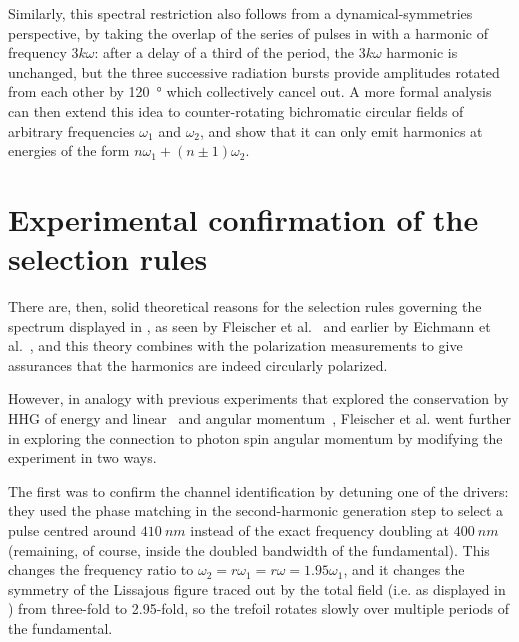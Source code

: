 Similarly, this spectral restriction also follows from a dynamical-symmetries perspective, by taking the overlap of the series of pulses in  with a harmonic of frequency $3k\omega$: after a delay of a third of the period, the $3k\omega$ harmonic is unchanged, but the three successive radiation bursts provide amplitudes rotated from each other by \SI{120}{\degree} which collectively cancel out. A more formal analysis~\cite{SelectionRulesInHHG, averbukh_stability_2002} can then extend this idea to counter-rotating bichromatic circular fields of arbitrary frequencies $\omega_1$ and $\omega_2$, and show that it can only emit harmonics at energies of the form $n\omega_1+(n\pm 1)\omega_2$.





\section{Experimental confirmation of the selection rules}
There are, then, solid theoretical reasons for the selection rules governing the spectrum displayed in , as seen by Fleischer et al.~\cite{fleischer_spin_2014} and earlier by Eichmann et al.~\cite{EichmannExperiment}, and this theory combines with the polarization measurements to give assurances that the harmonics are indeed circularly polarized.

However, in analogy with previous experiments that explored the conservation by HHG of energy \cite{EnergyConservationExperiment} and linear~\cite{ MomentumConservationExperiment} and angular momentum~\cite{ OAMConservationExperiment}, Fleischer et al. went further in exploring the connection to photon spin angular momentum by modifying the experiment in two ways.

The first was to confirm the channel identification by detuning one of the drivers: they used the phase matching in the second-harmonic generation step to select a pulse centred around $\SI{410}{nm}$ instead of the exact frequency doubling at $\SI{400}{nm}$ (remaining, of course, inside the doubled bandwidth of the fundamental). This changes the frequency ratio to $\omega_2=r\omega_1=r\omega=1.95\omega_1$, and it changes the symmetry of the Lissajous figure traced out by the total field (i.e. as displayed in ) from three-fold to 2.95-fold, so the trefoil rotates slowly over multiple periods of the fundamental. 

